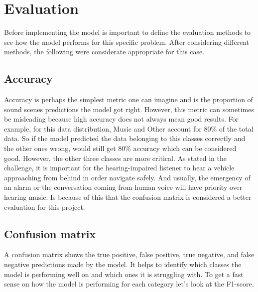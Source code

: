 \documentclass[12pt,oneside,a4paper,english]{article}
\begin{document}
\section{Evaluation}
Before implementing the model is important to define the evaluation methods to see how the model performs for this specific problem. After considering different methods, the following were considerate appropriate for this case.
\subsection{Accuracy}
Accuracy is perhaps the simplest metric one can imagine and is the proportion of sound scenes predictions the model got right.
However, this metric can sometimes be misleading because high accuracy does not always mean good results. For example, for this data distribution, Music and Other account for 80\% of the total data. So if the model predicted the data belonging to this classes correctly and the other ones wrong, would still get 80\% accuracy which can be considered good. However, the other three classes are more critical. As stated in the challenge, it is important for the hearing-impaired listener to hear a vehicle approaching from behind in order navigate safely. And usually, the emergency of an alarm or the conversation coming from human voice will have priority over hearing music. Is because of this that the confusion matrix is considered a better evaluation for this project.
\subsection{Confusion matrix}
A confusion matrix shows the true positive, false positive, true negative, and false negative predictions made by the model. It helps to identify which classes the model is performing well on and which ones it is struggling with. To get a fast sense on how the model is performing for each category let's look at the F1-score.
\end{document}
